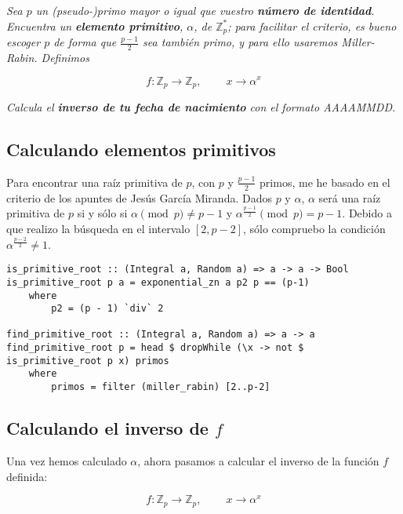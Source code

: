 \documentclass[10pt,spanish]{article}
\begin{document}
\textit{Sea $p$ un (pseudo-)primo mayor o igual que vuestro \textbf{\textcolor{azul}{número de identidad}}. Encuentra un \textbf{\textcolor{azul}{elemento primitivo}}, $\alpha$, de $\mathbb{Z}_p^*$; para facilitar el criterio, es bueno escoger $p$ de forma que $\frac{p-1}{2}$ sea también primo, y para ello usaremos Miller-Rabin. Definimos}

\begin{displaymath}
f: \mathbb{Z}_p \rightarrow \mathbb{Z}_p, \qquad\ x \rightarrow \alpha^x
\end{displaymath}

\textit{Calcula el \textcolor{azul}{\textbf{inverso de tu fecha de nacimiento}} con el formato AAAAMMDD.}

\subsection{\textcolor{azul}Calculando elementos primitivos}
Para encontrar una raíz primitiva de $p$, con $p$ y $\frac{p-1}{2}$ primos, me he basado en el criterio de los apuntes de Jesús García Miranda. Dados $p$ y $\alpha$, $\alpha$ será una raíz primitiva de $p$ si y sólo si $\alpha \pmod p \neq p-1$ y $\alpha^{\frac{p-1}{2}} \pmod p = p-1$. Debido a que realizo la búsqueda en el intervalo $[2,p-2]$, sólo compruebo la condición $\alpha^{\frac{p-2}{2}} \neq 1$.

\begin{verbatim}
is_primitive_root :: (Integral a, Random a) => a -> a -> Bool
is_primitive_root p a = exponential_zn a p2 p == (p-1)
    where
        p2 = (p - 1) `div` 2

find_primitive_root :: (Integral a, Random a) => a -> a
find_primitive_root p = head $ dropWhile (\x -> not $ is_primitive_root p x) primos
    where
        primos = filter (miller_rabin) [2..p-2]
\end{verbatim}

\subsection{\textcolor{azul}Calculando el inverso de $f$}
Una vez hemos calculado $\alpha$, ahora pasamos a calcular el inverso de la función $f$ definida:

\begin{displaymath}
f: \mathbb{Z}_p \rightarrow \mathbb{Z}_p, \qquad\ x \rightarrow \alpha^x
\end{displaymath}
\end{document}
